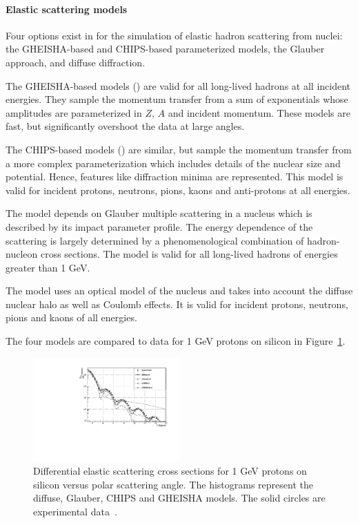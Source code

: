 \paragraph{Elastic scattering models}
Four options exist in \Gfour{} for the simulation of elastic hadron scattering
from nuclei: the GHEISHA-based and CHIPS-based parameterized models,
the Glauber approach, and diffuse diffraction.

The GHEISHA-based models () \cite{hadbib:gheisha} are
valid for all long-lived hadrons at all incident energies.  They sample the 
momentum transfer from a sum of exponentials whose amplitudes are parameterized
in $Z$, $A$ and incident momentum.  These models are fast, but significantly 
overshoot the data at large angles.

The CHIPS-based models () \cite{hadbib:CHIPS} are
similar, but sample the momentum transfer from a more complex parameterization
which includes details of the nuclear size and potential.  Hence, features like 
diffraction minima are represented.  This model is valid for incident protons,
neutrons, pions, kaons and anti-protons at all energies.

The  model depends on Glauber multiple scattering
\cite{hadbib:glauber70} in a nucleus which is described by its impact parameter 
profile.  The energy dependence of the scattering is largely determined by a 
phenomenological combination of hadron-nucleon cross sections.  The model is
valid for all long-lived hadrons of energies greater than 1 GeV.

The  model \cite{hadbib:difel} uses an optical model
of the nucleus and takes into account the diffuse nuclear halo as well as Coulomb 
effects.  It is valid for incident protons, neutrons, pions and kaons of all 
energies.    

The four models are compared to data for 1 GeV protons on silicon in 
Figure~\ref{pSiT1GeVmodsum}.

\begin{figure}
\includegraphics[width=0.5\textwidth]{figures/pSiT1GeVmodsum.pdf}
\caption{Differential elastic scattering cross sections for 1 GeV protons on 
         silicon versus polar scattering angle.  The histograms represent the 
         diffuse, Glauber, CHIPS and GHEISHA models. The solid circles are 
         experimental data~\cite{hadbib:alkh78}.}
\label{pSiT1GeVmodsum}
\end{figure}


